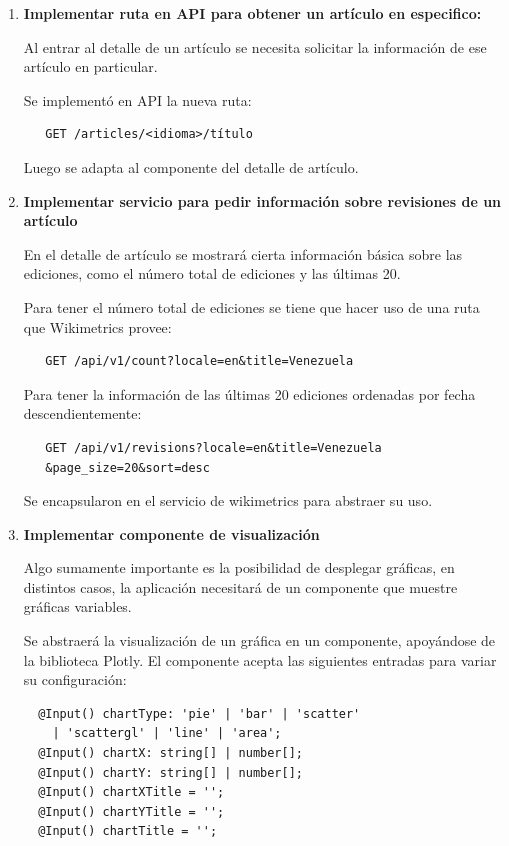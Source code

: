 \begin{enumerate}
  \smallbreak
  \item\textbf{Implementar ruta en API para obtener un artículo en especifico:}
  \smallbreak

  Al entrar al detalle de un artículo se necesita solicitar la información de ese artículo en particular.
  
  Se implementó en API la nueva ruta:
  \begin{verbatim}
   GET /articles/<idioma>/título
  \end{verbatim}
  
  Luego se adapta al componente del detalle de artículo.
  
  \smallbreak
  \item\textbf{Implementar servicio para pedir información sobre revisiones de un artículo}
  \smallbreak

  En el detalle de artículo se mostrará cierta información básica sobre las ediciones, como el número total de ediciones y las últimas 20.
  
  Para tener el número total de ediciones se tiene que hacer uso de una ruta que Wikimetrics provee:
  
  \begin{verbatim}
   GET /api/v1/count?locale=en&title=Venezuela
  \end{verbatim}
  
  Para tener la información de las últimas 20 ediciones ordenadas por fecha descendientemente:
  \begin{verbatim}
   GET /api/v1/revisions?locale=en&title=Venezuela
   &page_size=20&sort=desc
  \end{verbatim}
  
  Se encapsularon en el servicio de wikimetrics para abstraer su uso.
  
  \smallbreak
  \item\textbf{Implementar componente de visualización}
  \smallbreak

  Algo sumamente importante es la posibilidad de desplegar gráficas, en distintos casos, la aplicación necesitará de un componente que muestre gráficas variables.
  
  Se abstraerá la visualización de un gráfica en un componente, apoyándose de la biblioteca Plotly. El componente acepta las siguientes entradas para variar su configuración:
  
  \begin{verbatim}
  @Input() chartType: 'pie' | 'bar' | 'scatter'
    | 'scattergl' | 'line' | 'area';
  @Input() chartX: string[] | number[];
  @Input() chartY: string[] | number[];
  @Input() chartXTitle = '';
  @Input() chartYTitle = '';
  @Input() chartTitle = '';
  \end{verbatim}
  

\end{enumerate}
